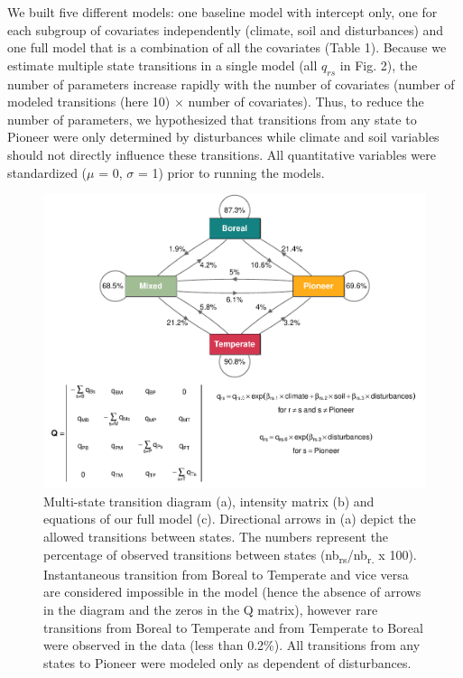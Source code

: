 \documentclass[a4paperpaper,]{article}
\begin{document}
We built five different models: one baseline model with intercept only,
one for each subgroup of covariates independently (climate, soil and
disturbances) and one full model that is a combination of all the
covariates (Table 1). Because we estimate multiple state transitions in
a single model (all \(q_{rs}\) in Fig. 2), the number of parameters
increase rapidly with the number of covariates (number of modeled
transitions (here 10) \(\times\) number of covariates). Thus, to reduce
the number of parameters, we hypothesized that transitions from any
state to Pioneer were only determined by disturbances while climate and
soil variables should not directly influence these transitions. All
quantitative variables were standardized (\(\mu\) = 0, \(\sigma\) = 1)
prior to running the models.

\begin{figure}
\centering
\includegraphics{res/fig2_trans_diagram.pdf}
\caption{Multi-state transition diagram (a), intensity matrix (b) and
equations of our full model (c). Directional arrows in (a) depict the
allowed transitions between states. The numbers represent the percentage
of observed transitions between states
(nb\textsubscript{rs}/nb\textsubscript{r.} x 100). Instantaneous
transition from Boreal to Temperate and vice versa are considered
impossible in the model (hence the absence of arrows in the diagram and
the zeros in the Q matrix), however rare transitions from Boreal to
Temperate and from Temperate to Boreal were observed in the data (less
than 0.2\%). All transitions from any states to Pioneer were modeled
only as dependent of disturbances.}
\end{figure}
\end{document}
